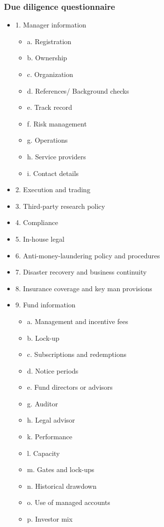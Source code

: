\subsubsection{Due diligence questionnaire}
\begin{itemize}
\item 1. Manager information
    \begin{itemize}
    \item a. Registration
    \item b. Ownership
    \item c. Organization
    \item d. References/ Background checks
    \item e. Track record
    \item f. Risk management
    \item g. Operations
    \item h. Service providers
    \item i. Contact details
    \end{itemize}
\item 2. Execution and trading
\item 3. Third-party research policy
\item 4. Compliance
\item 5. In-house legal
\item 6. Anti-money-laundering policy and procedures
\item 7. Disaster recovery and business continuity
\item 8. Insurance coverage and key man provisions
\item 9. Fund information
    \begin{itemize}
    \item a. Management and incentive fees
    \item b. Lock-up
    \item c. Subscriptions and redemptions
    \item d. Notice periods
    \item e. Fund directors or advisors
    \item g. Auditor
    \item h. Legal advisor
    \item k. Performance
    \item l. Capacity
    \item m. Gates and lock-ups
    \item n. Historical drawdown
    \item o. Use of managed accounts
    \item p. Investor mix

\end{itemize}
\end{itemize}
